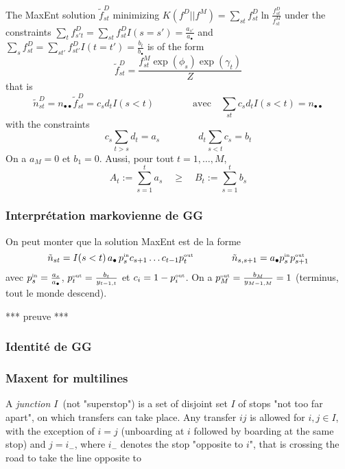\documentclass{article}
\theoremstyle{plain}
\begin{document}
The MaxEnt solution $\tilde{f}_{st}^D$ minimizing $K(f^D|| f^M)=\sum_{st}f_{st}^D\ln \frac{f_{st}^D}{f_{st}^M}$ under the constraints 
$\sum_t f_{s't}^D=\sum_{st} f_{st}^DI(s=s')=\frac{a_{s'}}{a_\bullet}$ and $\sum_s f_{st}^D=\sum_{st'} f_{st'}^DI(t=t')=\frac{b_t}{b_\bullet}$ is of the form 
\begin{displaymath}
\tilde{f}_{st}^D=\frac{f_{st}^M \exp(\phi_s)\exp(\gamma_t)}{Z}
\end{displaymath}
that is 
\begin{displaymath}
\tilde{n}_{st}^D=n_{\bullet\bullet} \tilde{f}_{st}^D=c_sd_t I(s<t)\qquad\qquad\mbox{avec}\quad \sum_{st}c_sd_t I(s<t)=n_{\bullet\bullet}
\end{displaymath}
with the constraints
\begin{equation}
\label{ConstS}
c_s \sum_{t>s}d_t=a_s\qquad\qquad d_t \sum_{s<t}c_s =b_t
\end{equation}
On a $a_M=0$ et $b_1=0$. Aussi, pour tout $t=1,\ldots, M$, 
\begin{displaymath}
A_t:=\sum_{s=1}^t a_s\quad \ge \quad B_t:=\sum_{s=1}^t b_s
\end{displaymath}



\subsubsection{Interprétation markovienne de GG}
On peut monter que la  solution MaxEnt est de la forme 
\begin{equation}
\label{ }
\tilde{n}_{st}=I(s<t)\, a_{\bullet}\,  p_s^{\mbox{\tiny in}}c_{s+1}\ldots c_{t-1} p_t^{\mbox{\tiny out}}
\qquad\qquad \tilde{n}_{s,s+1}=a_{\bullet} p_s^{\mbox{\tiny in}} p_{s+1}^{\mbox{\tiny out}}
\end{equation}
avec $p_s^{\mbox{\tiny in}}=\frac{a_s}{a_{\bullet}}$,  \quad $p_t^{\mbox{\tiny out}}=\frac{b_t}{y_{t-1,t}}$ et $c_i=1-p_i^{\mbox{\tiny out}}$. On a $p_M^{\mbox{\tiny out}}=\frac{b_M}{y_{M-1,M}}=1$ (terminus, tout le monde descend). 

*** preuve *** 

\subsubsection{Identité de GG}




\subsubsection{Maxent for multilines}
A {\em junction $I$} (not "superstop") is a set of disjoint set $I$ of stops "not too far apart", on which transfers can take place. Any transfer $ij$ is allowed for $i,j\in I$, with the exception of $i=j$ (unboarding at $i$ followed by boarding at the same stop) and $j=i_-$, where $i_-$ denotes the stop "opposite to $i$", that is crossing the road to take the line opposite to 
\end{document}
